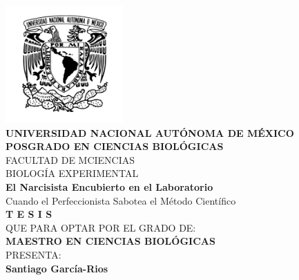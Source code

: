 \documentclass[
  10pt]{article}
\begin{document}
\begin{titlepage}
    \begin{center}
        \vspace*{-0.5cm} %
        
        \includegraphics[width=4.5cm]{ figuras/unam.png }\\[0.5cm]
        
        {\large \textbf{UNIVERSIDAD NACIONAL AUTÓNOMA DE MÉXICO}}\\[0.4cm]
        
        {\large \textbf{\MakeUppercase{Posgrado en Ciencias
Biológicas}}}\\[1cm]
        
        {\large \MakeUppercase{Facultad de mCiencias}}\\[0.4cm]
        {\large \MakeUppercase{Biología Experimental}}\\[1.2cm]
        
        {\Large \textbf{El Narcisista Encubierto en el
Laboratorio}}\\[0.3cm]
        {\small  Cuando el Perfeccionista Sabotea el Método
Científico }\\[0.6cm]
        
        {\LARGE \textbf{T E S I S}}\\[1cm]
        
        {\large QUE PARA OPTAR POR EL GRADO DE:}\\[0.15cm]
        {\Large \textbf{MAESTRO EN CIENCIAS BIOLÓGICAS}}\\[0.8cm]
        
        {\large PRESENTA:}\\[0.3cm]
        {\LARGE \textbf{Santiago García-Rios}}\\[0.8cm]
        

\end{center}
\end{titlepage}
\end{document}
